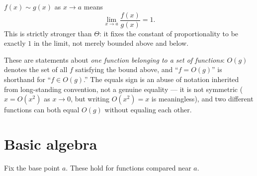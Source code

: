 \documentclass{essay}
\begin{document}
\begin{definition}
  \(f(x) \sim g(x)\) as \(x\to a\) means
  \[ \lim_{x\to a} \frac{f(x)}{g(x)} = 1. \]
  This is strictly stronger than \(\Theta\): it fixes the constant of proportionality to be exactly \(1\) in the limit, not merely bounded above and below.
\end{definition}

\begin{remark}
  These are statements about \emph{one function belonging to a set of functions}: \(O(g)\) denotes the set of all \(f\) satisfying the bound above, and ``\(f=O(g)\)'' is shorthand for ``\(f\in O(g)\).'' The equals sign is an abuse of notation inherited from long-standing convention, not a genuine equality --- it is not symmetric (\(x=O(x^{2})\) as \(x\to 0\), but writing \(O(x^{2})=x\) is meaningless), and two different functions can both equal \(O(g)\) without equaling each other.
\end{remark}

\section{Basic algebra}

Fix the base point \(a\). These hold for functions compared near \(a\).
\end{document}
